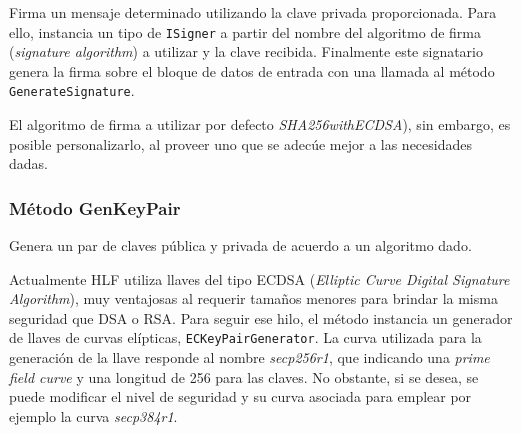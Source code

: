Firma un mensaje determinado utilizando la clave privada proporcionada. Para ello, instancia un tipo de \texttt{ISigner} a partir del nombre del algoritmo de firma (\emph{signature algorithm}) a utilizar y la clave recibida. Finalmente este signatario genera la firma sobre el bloque de datos de entrada con una llamada al m\'etodo \texttt{GenerateSignature}.

El algoritmo de firma a utilizar por defecto \emph{SHA256withECDSA}), sin embargo, es posible personalizarlo, al proveer uno que se adec\'ue mejor a las necesidades dadas.

\subsubsection{M\'etodo GenKeyPair}
Genera un par de claves pública y privada de acuerdo a un algoritmo dado.

Actualmente HLF utiliza llaves del tipo ECDSA (\emph{Elliptic Curve Digital Signature Algorithm}), muy ventajosas al requerir tamaños menores para brindar la misma seguridad que DSA o RSA. Para seguir ese hilo, el m\'etodo instancia un generador de llaves de curvas el\'ipticas, \texttt{ECKeyPairGenerator}. La curva utilizada para la generaci\'on de la llave responde al nombre \emph{secp256r1}, que indicando una \emph{prime field curve} y una longitud de 256 para las claves. No obstante, si se desea, se puede modificar el nivel de seguridad y su curva asociada para emplear por ejemplo la curva \emph{secp384r1}.




